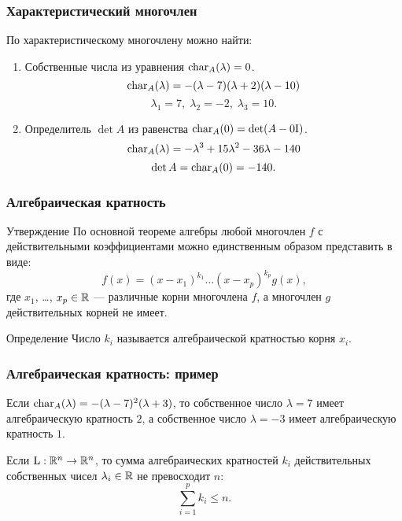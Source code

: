  \begin{frame}
     \frametitle{Характеристический многочлен}

     По характеристическому многочлену можно найти: \pause

     \begin{enumerate}
         \item Собственные числа из уравнения $\operatorname{char}_{A}(\lambda) = 0$.
         \[
            \operatorname{char}_{A}(\lambda)  = -(\lambda - 7)(\lambda + 2)(\lambda - 10)    
         \]
         \[
         \lambda_1 = 7, \; \lambda_2 = -2, \; \lambda_3 = 10.    
         \]
         
         \pause
         \item Определитель $\det A$ из равенства $\operatorname{char}_{A}(0) = \det (A - 0\mathrm{I})$.
         \[
            \operatorname{char}_{A}(\lambda) =-\lambda^3  + 15\lambda^2   -36 \lambda  - 140 
         \]
         \[
         \det A = \operatorname{char}_A(0)=-140.
         \]

     \end{enumerate}
 
 
 \end{frame}


 \begin{frame}
     \frametitle{Алгебраическая кратность}

     \begin{block}{Утверждение}
    По основной теореме алгебры любой многочлен $f$ с действительными коэффициентами можно единственным образом представить в виде:
    \[
    f(x) = (x-x_1)^{k_1}\ldots (x-x_p)^{k_p} g(x),
    \]
    где $x_1$, \ldots, $x_p \in \mathbb{R}$ — различные корни многочлена $f$, а многочлен $g$ действительных корней не имеет. 
         
     \end{block}
 
     \pause
     \begin{block}{Определение}
        Число $k_i$ называется \alert{алгебраической кратностью} корня $x_i$.
     \end{block}
 
 \end{frame}


 \begin{frame}
     \frametitle{Алгебраическая кратность: пример}

     Если $\operatorname{char}_A(\lambda) = -(\lambda - 7)^2(\lambda + 3)$, то 
     собственное число $\lambda = 7$ имеет алгебраическую кратность $2$, 
     а собственное число $\lambda = -3$ имеет алгебраическую кратность $1$.
 
     \pause
     Если $\operatorname{L} : \mathbb{R}^n \to \mathbb{R}^n$, то сумма алгебраических кратностей $k_i$ 
     действительных собственных чисел $\lambda_i \in \mathbb{R}$
     не превосходит $n$:
    \[
    \sum_{i=1}^p k_i \leq n.
    \]

 \end{frame}



